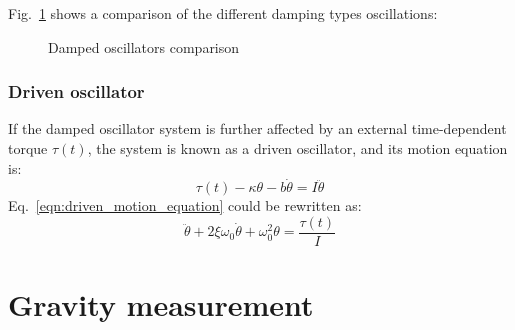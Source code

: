 \documentclass[\main/master.tex]{subfiles}
\begin{document}
\iffalse
\begin{equation}
\theta(t) = Ae^{-\frac{t}{\tau}(1+\sqrt{1-\frac{1}{\xi^2}})} + Be^{-\frac{t}{\tau}(1-\sqrt{1-\frac{1}{\xi^2}})}    \label{eqn:overdamped_motion_equation}
\end{equation}
\fi 
\par\noindent
Fig.~\ref{fig:damped_oscillators} shows a comparison of the different damping types oscillations:
\begin{figure}[htbp]
	\centering
	\caption[Damped oscillators comparison]{Damped oscillators comparison}
	\label{fig:damped_oscillators}
\end{figure}
\FloatBarrier
\iffalse
https://ocw.mit.edu/courses/mathematics/18-03sc-differential-equations-fall-2011/unit-ii-second-order-constant-coefficient-linear-equations/damped-harmonic-oscillators/MIT18_03SCF11_s13_2text.pdf

https://www.sciencedirect.com/topics/engineering/underdamped-system#:~:text=When%
\fi
\subsubsection{Driven oscillator}
If the damped oscillator system is further affected by an external time-dependent torque $\tau(t)$, the system is known as a driven oscillator, and its motion equation is:
\begin{equation}
\tau(t) -\kappa\theta - b\dot{\theta}  = I\ddot{\theta}   \label{eqn:driven_motion_equation}
\end{equation} 
Eq.~\ref{eqn:driven_motion_equation} could be rewritten as:
\begin{equation}
\ddot{\theta} + 2\xi\omega_0\dot{\theta} + \omega_0^2\theta = \frac{\tau(t)}{I}   \label{eqn:driven_motion_equation_2}
\end{equation}






\section{Gravity measurement}
\end{document}
